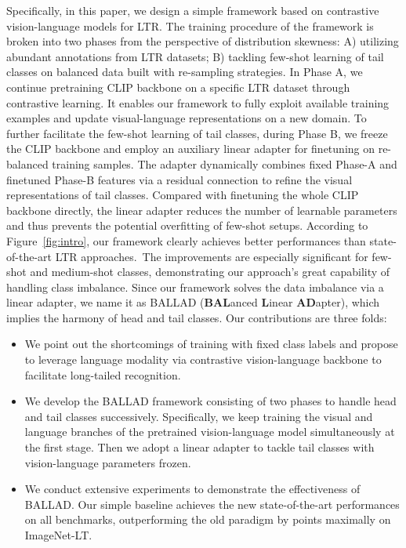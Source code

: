 \documentclass[10pt,twocolumn,letterpaper]{article}
\newcommand{\approach}{\textsc{BALLAD}}
\begin{document}
Specifically, in this paper, we design a simple framework based on contrastive vision-language models for LTR. The training procedure of the framework is broken into two phases from the perspective of distribution skewness: A) utilizing abundant annotations from LTR datasets; B) tackling few-shot learning of tail classes on balanced data built with re-sampling strategies. In Phase A, we continue pretraining CLIP backbone on a specific LTR dataset through contrastive learning. It enables our framework to fully exploit available training examples and update visual-language representations on a new domain.
To further facilitate the few-shot learning of tail classes, during Phase B, we freeze the CLIP backbone and employ an auxiliary linear adapter for finetuning on re-balanced training samples. The adapter dynamically combines fixed Phase-A and finetuned Phase-B features via a residual connection to refine the visual representations of tail classes. Compared with finetuning the whole CLIP backbone directly, the linear adapter reduces the number of learnable parameters and thus prevents the potential overfitting of few-shot setups.
According to Figure~\ref{fig:intro}, our framework clearly achieves better performances than state-of-the-art LTR approaches.~The improvements are especially significant for few-shot and medium-shot classes, demonstrating our approach's great capability of handling class imbalance. Since our framework solves the data imbalance via a linear adapter, we name it as \approach{} (\textbf{BAL}anced \textbf{L}inear \textbf{AD}apter), which implies the harmony of head and tail classes.
Our contributions are three folds:
\begin{itemize}[leftmargin=*,noitemsep] 
    \item We point out the shortcomings of training with fixed class labels and propose to leverage language modality via contrastive vision-language backbone to facilitate long-tailed recognition.
    \item We develop the \approach{} framework consisting of two phases to handle head and tail classes successively. Specifically, we keep training the visual and language branches of the pretrained vision-language model simultaneously at the first stage. Then we adopt a linear adapter to tackle tail classes with vision-language parameters frozen.
\item We conduct extensive experiments to demonstrate the effectiveness of \approach{}. Our simple baseline achieves the new state-of-the-art performances on all benchmarks, outperforming the old paradigm by  points maximally on ImageNet-LT.
\end{itemize}
\end{document}
